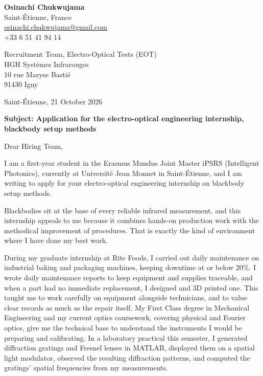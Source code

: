\documentclass[11pt,a4paper]{article}
\begin{document}
\textbf{Osinachi Chukwujama}\\
Saint-Étienne, France\\
\href{mailto:osinachi.chukwujama@gmail.com}{osinachi.chukwujama@gmail.com}\\
+33 6 51 41 94 14

\begin{flushright}
Recruitment Team, Electro-Optical Tests (EOT)\\
HGH Systèmes Infrarouges\\
10 rue Maryse Bastié\\
91430 Igny

\vspace{0.8em}
Saint-Étienne, 21 October 2026
\end{flushright}

\vspace{0.5em}
\textbf{Subject: Application for the electro-optical engineering internship, blackbody setup methods}

Dear Hiring Team,

I am a first-year student in the Erasmus Mundus Joint Master iPSRS (Intelligent Photonics), currently at Université Jean Monnet in Saint-Étienne, and I am writing to apply for your electro-optical engineering internship on blackbody setup methods.

Blackbodies sit at the base of every reliable infrared measurement, and this internship appeals to me because it combines hands-on production work with the methodical improvement of procedures. That is exactly the kind of environment where I have done my best work.

During my graduate internship at Rite Foods, I carried out daily maintenance on industrial baking and packaging machines, keeping downtime at or below 20\%. I wrote daily maintenance reports to keep equipment and supplies traceable, and when a part had no immediate replacement, I designed and 3D printed one. This taught me to work carefully on equipment alongside technicians, and to value clear records as much as the repair itself. My First Class degree in Mechanical Engineering and my current optics coursework, covering physical and Fourier optics, give me the technical base to understand the instruments I would be preparing and calibrating. In a laboratory practical this semester, I generated diffraction gratings and Fresnel lenses in MATLAB, displayed them on a spatial light modulator, observed the resulting diffraction patterns, and computed the gratings' spatial frequencies from my measurements.
\end{document}

